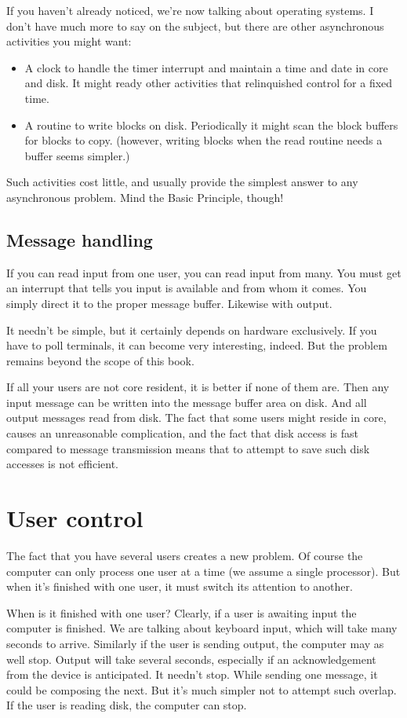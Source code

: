 \documentclass[b5paper, oneside]{book}
\begin{document}
If you haven't already noticed, we're now talking about operating systems. I don't have much more to say on the subject, but there are other asynchronous activities you might want:\begin{itemize}
   \item A clock to handle the timer interrupt and maintain a time and date in core and disk. It might ready other activities that relinquished control for a fixed time.
   \item A routine to write blocks on disk. Periodically it might scan the block buffers for blocks to copy. (however, writing blocks when the read routine needs a buffer seems simpler.)\end{itemize}
Such activities cost little, and usually provide the simplest answer to any asynchronous problem. Mind the Basic Principle, though!

\subsection{Message handling}
If you can read input from one user, you can read input from many. You must get an interrupt that tells you input is available and from whom it comes. You simply direct it to the proper message buffer. Likewise with output.

It needn't be simple, but it certainly depends on hardware exclusively. If you have to poll terminals, it can become very interesting, indeed. But the problem remains beyond the scope of this book.

If all your users are not core resident, it is better if none of them are. Then any input message can be written into the message buffer area on disk. And all output messages read from disk. The fact that some users might reside in core, causes an unreasonable complication, and the fact that disk access is fast compared to message transmission means that to attempt to save such disk accesses is not efficient.

\section{User control}
The fact that you have several users creates a new problem. Of course the computer can only process one user at a time (we assume a single processor). But when it's finished with one user, it must switch its attention to another.

When is it finished with one user? Clearly, if a user is awaiting input the computer is finished. We are talking about keyboard input, which will take many seconds to arrive. Similarly if the user is sending output, the computer may as well stop. Output will take several seconds, especially if an acknowledgement from the device is anticipated. It needn't stop. While sending one message, it could be composing the next. But it's much simpler not to attempt such overlap. If the user is reading disk, the computer can stop.
\end{document}
